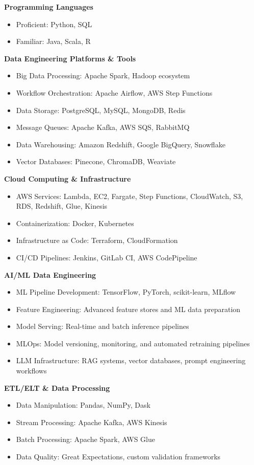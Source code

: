 \documentclass[10pt,a4paper,ragged2e,withhyper]{altacv}
\begin{document}
\begin{itemize}[noitemsep]

\textbf{Programming Languages}
\begin{itemize}
  \item Proficient: Python, SQL
  \item Familiar: Java, Scala, R
\end{itemize}

\textbf{Data Engineering Platforms \& Tools}
\begin{itemize}
  \item Big Data Processing: Apache Spark, Hadoop ecosystem
  \item Workflow Orchestration: Apache Airflow, AWS Step Functions
  \item Data Storage: PostgreSQL, MySQL, MongoDB, Redis
  \item Message Queues: Apache Kafka, AWS SQS, RabbitMQ
  \item Data Warehousing: Amazon Redshift, Google BigQuery, Snowflake
  \item Vector Databases: Pinecone, ChromaDB, Weaviate
\end{itemize}

\textbf{Cloud Computing \& Infrastructure}
\begin{itemize}
  \item AWS Services: Lambda, EC2, Fargate, Step Functions, CloudWatch, S3, RDS, Redshift, Glue, Kinesis
  \item Containerization: Docker, Kubernetes
  \item Infrastructure as Code: Terraform, CloudFormation
  \item CI/CD Pipelines: Jenkins, GitLab CI, AWS CodePipeline
\end{itemize}

\textbf{AI/ML Data Engineering}
\begin{itemize}
  \item ML Pipeline Development: TensorFlow, PyTorch, scikit-learn, MLflow
  \item Feature Engineering: Advanced feature stores and ML data preparation
  \item Model Serving: Real-time and batch inference pipelines
  \item MLOps: Model versioning, monitoring, and automated retraining pipelines
  \item LLM Infrastructure: RAG systems, vector databases, prompt engineering workflows
\end{itemize}

\textbf{ETL/ELT \& Data Processing}
\begin{itemize}
  \item Data Manipulation: Pandas, NumPy, Dask
  \item Stream Processing: Apache Kafka, AWS Kinesis
  \item Batch Processing: Apache Spark, AWS Glue
  \item Data Quality: Great Expectations, custom validation frameworks
\end{itemize}


\end{itemize}
\end{document}
